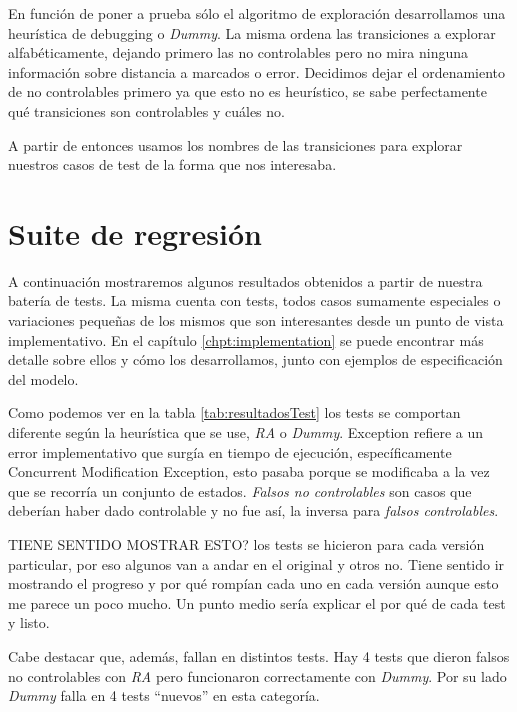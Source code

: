 En función de poner a prueba sólo el algoritmo de exploración desarrollamos una heurística de debugging o \textit{Dummy}. La misma ordena las transiciones a explorar alfabéticamente, dejando primero las no controlables pero no mira ninguna información sobre distancia a marcados o error. Decidimos dejar el ordenamiento de no controlables primero ya que esto no es heurístico, se sabe perfectamente qué transiciones son controlables y cuáles no.

A partir de entonces usamos los nombres de las transiciones para explorar nuestros casos de test de la forma que nos interesaba. 

\section{Suite de regresión}
A continuación mostraremos algunos resultados obtenidos a partir de nuestra batería de tests. La misma cuenta con \totalTests tests, todos casos sumamente especiales o variaciones pequeñas de los mismos que son interesantes desde un punto de vista implementativo. En el capítulo \ref{chpt:implementation} se puede encontrar más detalle sobre ellos y cómo los desarrollamos, junto con ejemplos de especificación del modelo.

Como podemos ver en la tabla \ref{tab:resultadosTest} los tests se comportan diferente según la heurística que se use, \textit{RA} o \textit{Dummy}. Exception refiere a un error implementativo que surgía en tiempo de ejecución, específicamente Concurrent Modification Exception, esto pasaba porque se modificaba a la vez que se recorría un conjunto de estados. \textit{Falsos  no controlables} son casos que deberían haber dado controlable y no fue así, la inversa para \textit{falsos controlables}.


TIENE SENTIDO MOSTRAR ESTO? los tests se hicieron para cada versión particular, por eso algunos van a andar en el original y otros no. Tiene sentido ir mostrando el progreso y por qué rompían cada uno en cada versión aunque esto me parece un poco mucho. Un punto medio sería explicar el por qué de cada test y listo.

Cabe destacar que, además, fallan en distintos tests. Hay 4 tests que dieron falsos no controlables con \textit{RA} pero funcionaron correctamente con \textit{Dummy}. Por su lado \textit{Dummy} falla en 4 tests ``nuevos'' en esta categoría.

